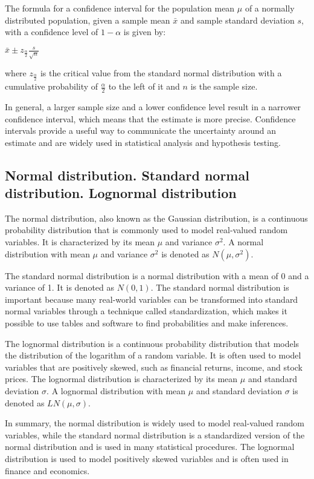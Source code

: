 \documentclass[12pt, a4paper, oneside]{article}
\begin{document}
The formula for a confidence interval for the population mean $\mu$ of a normally distributed population, given a sample mean $\bar{x}$ and sample standard deviation $s$, with a confidence level of $1 - \alpha$ is given by:

$\bar{x} \pm z_{\frac{\alpha}{2}} \frac{s}{\sqrt{n}}$

where $z_{\frac{\alpha}{2}}$ is the critical value from the standard normal distribution with a cumulative probability of $\frac{\alpha}{2}$ to the left of it and $n$ is the sample size.

In general, a larger sample size and a lower confidence level result in a narrower confidence interval, which means that the estimate is more precise. Confidence intervals provide a useful way to communicate the uncertainty around an estimate and are widely used in statistical analysis and hypothesis testing.
\subsection{ Normal distribution. Standard normal distribution. Lognormal distribution }
The normal distribution, also known as the Gaussian distribution, is a continuous probability distribution that is commonly used to model real-valued random variables. It is characterized by its mean $\mu$ and variance $\sigma^2$. A normal distribution with mean $\mu$ and variance $\sigma^2$ is denoted as $N(\mu, \sigma^2)$.

The standard normal distribution is a normal distribution with a mean of 0 and a variance of 1. It is denoted as $N(0, 1)$. The standard normal distribution is important because many real-world variables can be transformed into standard normal variables through a technique called standardization, which makes it possible to use tables and software to find probabilities and make inferences.

The lognormal distribution is a continuous probability distribution that models the distribution of the logarithm of a random variable. It is often used to model variables that are positively skewed, such as financial returns, income, and stock prices. The lognormal distribution is characterized by its mean $\mu$ and standard deviation $\sigma$. A lognormal distribution with mean $\mu$ and standard deviation $\sigma$ is denoted as $LN(\mu, \sigma)$.

In summary, the normal distribution is widely used to model real-valued random variables, while the standard normal distribution is a standardized version of the normal distribution and is used in many statistical procedures. The lognormal distribution is used to model positively skewed variables and is often used in finance and economics.
\end{document}
